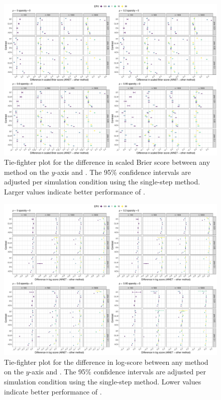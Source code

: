 \documentclass[a4paper, 11pt]{article}
\begin{document}
\begin{landscape}
\begin{figure}[!ht]
\center
\includegraphics[width=0.8\linewidth]{figures-appendix/tie-fighter_scaledBrier_sparsity0.pdf}
\caption{Tie-fighter plot for the difference in scaled Brier score between any
  method on the $y$-axis and \ainet{}. The 95\% confidence intervals are adjusted
  per simulation condition using the single-step method. Larger
  values indicate better performance of \ainet{}. } \label{fig:tiesbrier}
\end{figure}
\end{landscape}

\begin{landscape}
\begin{figure}[!ht]
\center
\includegraphics[width=0.8\linewidth]{figures-appendix/tie-fighter_nll_sparsity0.pdf}
\caption{Tie-fighter plot for the difference in log-score between any method on
  the $y$-axis and \ainet{}. The 95\% confidence intervals are adjusted per
  simulation condition using the single-step method. Lower values indicate
  better performance of \ainet{}. } \label{fig:tienll}
\end{figure}
\end{landscape}
\end{document}
